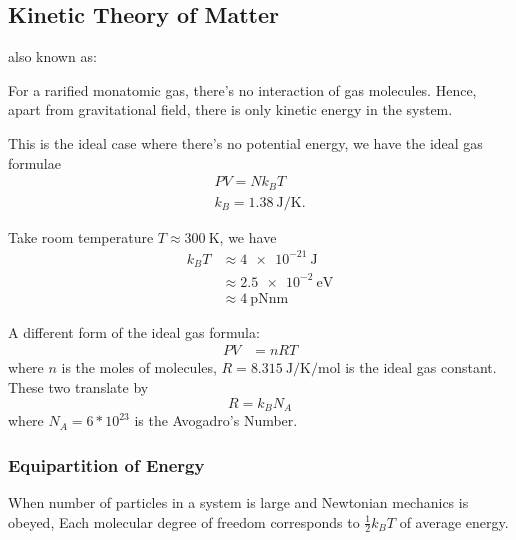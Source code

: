 
\subsection{Kinetic Theory of Matter}
also known as: 

For a rarified monatomic gas, there's no interaction of gas molecules. Hence, apart from gravitational field, there is only kinetic energy in the system. 

This is the ideal case where there's no potential energy, we have the ideal gas formulae
\begin{gather*}
	P V = N k_B T \\
	k_B = \SI{1.38}{\joule \per \kelvin}
	.
\end{gather*}

Take room temperature $T \approx \SI{300}{\kelvin}$, we have
\begin{align}
	k_B T &\approx \SI{4e-21}{\joule}\\
	      &\approx \SI{2.5e-2}{\electronvolt}\\
	      &\approx \SI{4}{\pico\newton \nano\metre}
\end{align}

A different form of the ideal gas formula:
\begin{align*}
	P V &= n R T
\end{align*} 
where $n$ is the moles of molecules, $R = \SI{8.315}{\joule \per \kelvin \per \mole}$ is the ideal gas constant. 
These two translate by \[
R = k_B N_A
\] where $N_A = 6 * 10^{23}$ is the Avogadro's Number.

\subsubsection{Equipartition of Energy}

\begin{theorem}
	When number of particles in a system is large and Newtonian mechanics is obeyed,
	Each molecular degree of freedom corresponds to $\frac{1}{2}k_B T$ of average energy.
\end{theorem}

